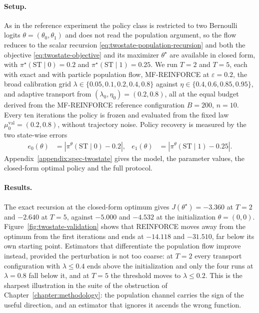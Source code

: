 \paragraph{Setup.}
As in the reference experiment the policy class is restricted to two Bernoulli logits $\theta=(\theta_0,\theta_1)$ and does not read the population argument, so the flow reduces to the scalar recursion \eqref{eq:twostate-population-recursion} and both the objective \eqref{eq:twostate-objective} and its maximizer $\theta^\star$ are available in closed form, with $\pi^\star(\mathrm{ST}\mid0)=0.2$ and $\pi^\star(\mathrm{ST}\mid1)=0.25$. We run $T=2$ and $T=5$, each with exact and with particle population flow, MF-REINFORCE at $\varepsilon=0.2$, the broad calibration grid $\lambda\in\{0.05,0.1,0.2,0.4,0.8\}$ against $\eta\in\{0.4,0.6,0.85,0.95\}$, and adaptive transport from $(\lambda_0,\eta_0)=(0.2,0.8)$, all at the equal budget derived from the MF-REINFORCE reference configuration $B=200$, $n=10$. Every ten iterations the policy is frozen and evaluated from the fixed law $\mu_0^{\mathrm{val}}=(0.2,0.8)$, without trajectory noise. Policy recovery is measured by the two state-wise errors
\begin{align}
    e_0(\theta) &= \left|\pi^\theta(\mathrm{ST}\mid 0)-0.2\right|, & e_1(\theta) &= \left|\pi^\theta(\mathrm{ST}\mid 1)-0.25\right|.
    \label{eq:twostate-policy-errors}
\end{align}
Appendix~\ref{appendix:spec-twostate} gives the model, the parameter values, the closed-form optimal policy and the full protocol.

\paragraph{Results.}
The exact recursion at the closed-form optimum gives $J(\theta^\star)=-3.360$ at $T=2$ and $-2.640$ at $T=5$, against $-5.000$ and $-4.532$ at the initialization $\theta=(0,0)$. Figure~\ref{fig:twostate-validation} shows that REINFORCE moves away from the optimum from the first iterations and ends at $-14.118$ and $-31.510$, far below its own starting point. Estimators that differentiate the population flow improve instead, provided the perturbation is not too coarse: at $T=2$ every transport configuration with $\lambda\leq0.4$ ends above the initialization and only the four runs at $\lambda=0.8$ fall below it, and at $T=5$ the threshold moves to $\lambda\leq0.2$. This is the sharpest illustration in the suite of the obstruction of Chapter~\ref{chapter:methodology}: the population channel carries the sign of the useful direction, and an estimator that ignores it ascends the wrong function.

